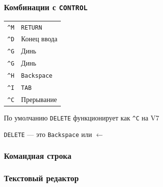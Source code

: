 \documentclass[t,aspectratio=169]{beamer}
\begin{document}
\begin{frame}
    \frametitle{Комбинации с \texttt{CONTROL}}
    \begin{tabular}{cl}
        \texttt{\^}\texttt{M} & \texttt{RETURN} \\
        \texttt{\^}\texttt{D} & Конец ввода \\
        \texttt{\^}\texttt{G} & Динь\\
        \texttt{\^}\texttt{G} & Динь\\
        \texttt{\^}\texttt{H} & \texttt{Backspace}\\
        \texttt{\^}\texttt{I} & \texttt{TAB}\\
        \texttt{\^}\texttt{C} & Прерывание
    \end{tabular}
    \par\vspace{0.25cm}
    По умолчанию \texttt{DELETE} функционирует как \texttt{\^}\texttt{C}
    на V7
    \par\vspace{0.25cm}
    \texttt{DELETE} --- это \texttt{Backspace} или $\leftarrow$
\end{frame}

\begin{frame}
    \frametitle{Командная строка}
\end{frame}

\begin{frame}
    \frametitle{Текстовый редактор}
\end{frame}
\end{document}
